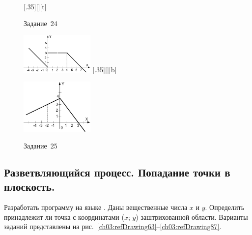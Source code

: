 \begin{figure}[h]
\begin{floatrow}
[.35\textwidth][\FBheight][t]
{\caption{Задание~24}
\label{ch03:refDrawing61}}
{\includegraphics[width=0.32\textwidth,keepaspectratio]{img/ris_3_62}}%
%
[.35\textwidth][\FBheight][b]
{\caption{Задание~25}
\label{ch03:refDrawing62}}
{\includegraphics[width=0.32\textwidth]{img/ris_3_63}}
\end{floatrow}
\end{figure}

\subsection[Разветвляющийся процесс. Попадание точки в плоскость.]{Разветвляющийся процесс. Попадание точки в
плоскость.}
Разработать программу на языке . Даны вещественные числа $x$ и $y$. Определить
принадлежит ли точка с координатами ($x$; $y$) заштрихованной области.
Варианты заданий представлены на рис.~\ref{ch03:refDrawing63}--\ref{ch03:refDrawing87}.


